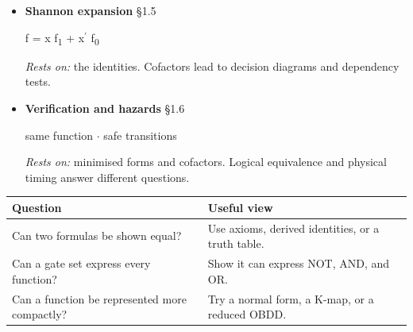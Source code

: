 \documentclass[11pt]{article}
\begin{document}
\begin{keepsection}
\begin{itemize}
duality \ensuremath{\cdot} De Morgan \ensuremath{\cdot} absorption

\emph{Rests on:} the axioms. Derived laws shorten proofs and expressions.
\item {}
\textbf{Shannon expansion} \hfill{\small\color{FAUblue}§1.5}

f = x f\textsubscript{1} + x\ensuremath{{}^{\prime}} f\textsubscript{0}

\emph{Rests on:} the identities. Cofactors lead to decision diagrams and dependency tests.
\item {}
\textbf{Verification and hazards} \hfill{\small\color{FAUblue}§1.6}

same function \ensuremath{\cdot} safe transitions

\emph{Rests on:} minimised forms and cofactors. Logical equivalence and physical timing answer different questions.
\end{itemize}

\begin{center}\small\begin{tabularx}{\linewidth}{>{\raggedright\arraybackslash}X>{\raggedright\arraybackslash}X}\toprule
\textbf{Question} & \textbf{Useful view} \\ \midrule
Can two formulas be shown equal? & Use axioms, derived identities, or a truth table. \\
Can a gate set express every function? & Show it can express NOT, AND, and OR. \\
Can a function be represented more compactly? & Try a normal form, a K-map, or a reduced OBDD. \\
\bottomrule\end{tabularx}\end{center}
\end{keepsection}
\end{document}
